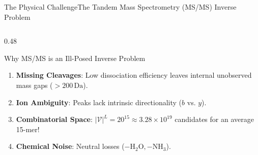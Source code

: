 \documentclass[aspectratio=169, 10pt]{beamer}
\begin{document}
\begin{frame}{The Physical Challenge}{The Tandem Mass Spectrometry (MS/MS) Inverse Problem}
\begin{columns}[T]
\begin{column}{0.48\textwidth}
  \begin{alertblock}{\scriptsize Why MS/MS is an Ill-Posed Inverse Problem}
    \begin{enumerate}\setlength{\itemsep}{2pt}\scriptsize
      \item \textbf{Missing Cleavages}: Low dissociation efficiency leaves internal unobserved mass gaps ($>200\,\text{Da}$).
      \item \textbf{Ion Ambiguity}: Peaks lack intrinsic directionality ($b$ vs. $y$).
      \item \textbf{Combinatorial Space}: $|\mathcal{V}|^L = 20^{15} \approx 3.28 \times 10^{19}$ candidates for an average 15-mer!
      \item \textbf{Chemical Noise}: Neutral losses ($-\text{H}_2\text{O}, -\text{NH}_3$).
    \end{enumerate}
  \end{alertblock}
  \vspace{0.1cm}
\end{column}
\end{columns}
\end{frame}
\end{document}
